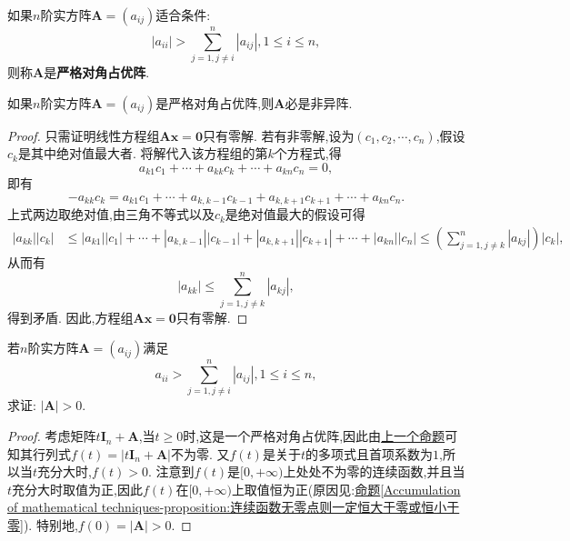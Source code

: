 \documentclass[lang=cn,newtx,10pt,scheme=chinese]{elegantbook}
\begin{document}
\begin{definition}[严格对角占优阵]\label{definition:严格对角占优阵}
如果\(n\)阶实方阵\(\boldsymbol{A}=(a_{ij})\)适合条件:
\[
|a_{ii}|>\sum_{j = 1,j\neq i}^{n}|a_{ij}|,1\leq i\leq n,
\]
则称\(\boldsymbol{A}\)是\textbf{严格对角占优阵}.
\end{definition}

\begin{proposition}[严格对角占优阵必是非异阵]\label{proposition:严格对角占优阵必是非异阵}
如果\(n\)阶实方阵\(\boldsymbol{A}=(a_{ij})\)是严格对角占优阵,则\(\boldsymbol{A}\)必是非异阵.
\end{proposition}
\begin{proof}
只需证明线性方程组\(\boldsymbol{A}\boldsymbol{x}=\boldsymbol{0}\)只有零解. 若有非零解,设为\((c_1,c_2,\cdots,c_n)\),假设\(c_k\)是其中绝对值最大者. 将解代入该方程组的第\(k\)个方程式,得
\[
a_{k1}c_1+\cdots + a_{kk}c_k+\cdots + a_{kn}c_n = 0,
\]
即有
\[
-a_{kk}c_k=a_{k1}c_1+\cdots + a_{k,k - 1}c_{k - 1}+a_{k,k + 1}c_{k + 1}+\cdots + a_{kn}c_n.
\]
上式两边取绝对值,由三角不等式以及\(c_k\)是绝对值最大的假设可得
\begin{align*}
|a_{kk}||c_k|&\leq|a_{k1}||c_1|+\cdots + |a_{k,k - 1}||c_{k - 1}|+|a_{k,k + 1}||c_{k + 1}|+\cdots + |a_{kn}||c_n|\leq\left(\sum_{j = 1,j\neq k}^{n}|a_{kj}|\right)|c_k|,
\end{align*}
从而有
\[
|a_{kk}|\leq\sum_{j = 1,j\neq k}^{n}|a_{kj}|,
\]
得到矛盾. 因此,方程组\(\boldsymbol{A}\boldsymbol{x}=\boldsymbol{0}\)只有零解.
\end{proof}

\begin{proposition}\label{proposition:更严格对角占优阵行列式必大于零}
若\(n\)阶实方阵\(\boldsymbol{A}=(a_{ij})\)满足
\[
a_{ii}>\sum_{j = 1,j\neq i}^{n}|a_{ij}|,1\leq i\leq n,
\]
求证: \(|\boldsymbol{A}|>0\).
\end{proposition}
\begin{proof}
考虑矩阵\(t\boldsymbol{I}_n+\boldsymbol{A}\),当\(t\geq0\)时,这是一个严格对角占优阵,因此由\hyperref[proposition:严格对角占优阵必是非异阵]{上一个命题}可知其行列式\(f(t)=|t\boldsymbol{I}_n+\boldsymbol{A}|\)不为零. 又\(f(t)\)是关于\(t\)的多项式且首项系数为\(1\),所以当\(t\)充分大时,\(f(t)>0\). 注意到\(f(t)\)是\([0,+\infty)\)上处处不为零的连续函数,并且当\(t\)充分大时取值为正,因此\(f(t)\)在\([0,+\infty)\)上取值恒为正(原因见:\hyperref[Accumulation of mathematical techniques-proposition:连续函数无零点则一定恒大于零或恒小于零]{命题\ref{Accumulation of mathematical techniques-proposition:连续函数无零点则一定恒大于零或恒小于零}}). 特别地,\(f(0)=|\boldsymbol{A}|>0\).
\end{proof}
\end{document}
